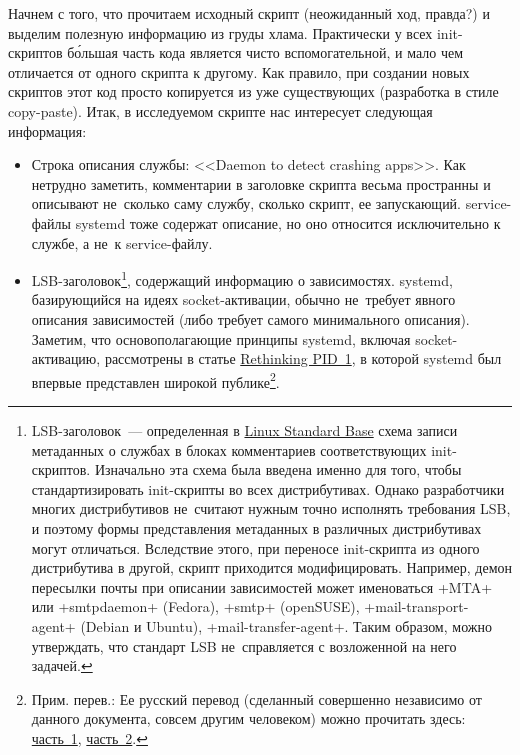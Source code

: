 \documentclass[10pt,oneside,a4paper]{article}
\begin{document}
Начнем с того, что прочитаем исходный скрипт (неожиданный ход, правда?) и
выделим полезную информацию из груды хлама. Практически у всех init-скриптов
б\'{о}льшая часть кода является чисто вспомогательной, и мало чем отличается от
одного скрипта к другому. Как правило, при создании новых скриптов этот код
просто копируется из уже существующих (разработка в стиле copy-paste). Итак,
в исследуемом скрипте нас интересует следующая информация: 

\begin{itemize}
	\item Строка описания службы: <<Daemon to detect crashing apps>>. Как
		нетрудно заметить, комментарии в заголовке скрипта весьма
		пространны и описывают не~сколько саму службу, сколько
		скрипт, ее запускающий. service-файлы systemd тоже содержат
		описание, но оно относится исключительно к службе, а не~к
		service-файлу. 
	\item LSB-заголовок\footnote{LSB-заголовок~--- определенная в
		\href{http://refspecs.freestandards.org/LSB_3.1.1/LSB-Core-generic/LSB-Core-generic/initscrcomconv.html}{Linux
		Standard Base} схема записи метаданных о службах в блоках
		комментариев соответствующих init-скриптов. Изначально эта
		схема была введена именно для того, чтобы стандартизировать
		init-скрипты во всех дистрибутивах. Однако разработчики
		многих дистрибутивов не~считают нужным точно исполнять
		требования LSB, и поэтому формы представления метаданных в
		различных дистрибутивах могут отличаться. Вследствие этого,
		при переносе init-скрипта из одного дистрибутива в другой,
		скрипт приходится модифицировать. Например, демон пересылки
		почты при описании зависимостей может именоваться
		+MTA+ или +smtpdaemon+ (Fedora), +smtp+
		(openSUSE), +mail-transport-agent+ (Debian и Ubuntu),
		+mail-transfer-agent+. Таким образом, можно утверждать, что
		стандарт LSB не~справляется с возложенной на него задачей.},
		содержащий информацию о зависимостях.  systemd, базирующийся
		на идеях socket-активации, обычно не~требует явного описания
		зависимостей (либо требует самого минимального описания).
		Заметим, что основополагающие принципы systemd, включая
		socket-активацию, рассмотрены в статье
		\href{http://0pointer.de/blog/projects/systemd.html}{Rethinking
		PID~1}, в которой systemd был впервые представлен широкой
		публике\footnote{Прим. перев.: Ее русский перевод (сделанный
		совершенно независимо от данного документа, совсем другим
		человеком) можно прочитать здесь:
		\href{http://tux-the-penguin.blogspot.com/2010/09/systemd.html}{часть~1},
		\href{http://tux-the-penguin.blogspot.com/2010/09/systemd-ii.html}{часть~2}.}.

\end{itemize}
\end{document}
